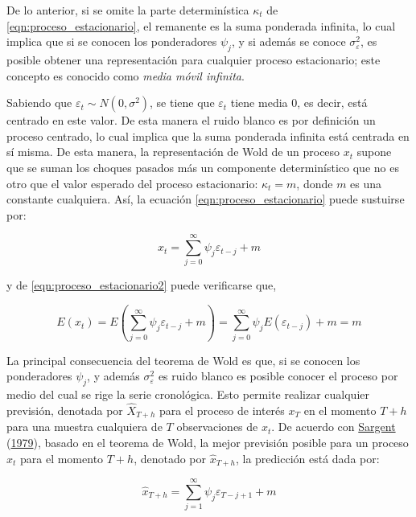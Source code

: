 \documentclass[
]{article}
\begin{document}
De lo anterior, si se omite la parte determinística \(\kappa_t\) de
\ref{eqn:proceso_estacionario}, el remanente es la suma ponderada
infinita, lo cual implica que si se conocen los ponderadores \(\psi_j\),
y si además se conoce \(\sigma_\varepsilon^2\), es posible obtener una
representación para cualquier proceso estacionario; este concepto es
conocido como \emph{media móvil infinita}.

Sabiendo que \(\varepsilon_t \sim N(0, \sigma^2)\), se tiene que
\(\varepsilon_t\) tiene media 0, es decir, está centrado en este valor.
De esta manera el ruido blanco es por definición un proceso centrado, lo
cual implica que la suma ponderada infinita está centrada en sí misma.
De esta manera, la representación de Wold de un proceso \(x_t\) supone
que se suman los choques pasados más un componente determinístico que no
es otro que el valor esperado del proceso estacionario: \(\kappa_t=m\),
donde \(m\) es una constante cualquiera. Así, la ecuación
\ref{eqn:proceso_estacionario} puede sustuirse por:

\begin{equation}
\label{eqn:proceso_estacionario2}
x_t=\sum_{j=0}^{\infty} \psi_j\varepsilon_{t-j}+m
\end{equation}

y de \ref{eqn:proceso_estacionario2} puede verificarse que,

\begin{equation}
\label{eqn:dem_proceso_estacionario2}
E(x_t)=E\left(\sum_{j=0}^{\infty} \psi_j\varepsilon_{t-j}+m\right)=\sum_{j=0}^{\infty} \psi_jE\left(\varepsilon_{t-j}\right) + m = m
\end{equation}

La principal consecuencia del teorema de Wold es que, si se conocen los
ponderadores \(\psi_j\), y además \(\sigma_\varepsilon^2\) es ruido
blanco es posible conocer el proceso por medio del cual se rige la serie
cronológica. Esto permite realizar cualquier previsión, denotada por
\(\hat X_{T+h}\) para el proceso de interés \(x_T\) en el momento
\(T+h\) para una muestra cualquiera de \(T\) observaciones de \(x_t\).
De acuerdo con \protect\hyperlink{ref-sargent_macro}{Sargent}
(\protect\hyperlink{ref-sargent_macro}{1979}), basado en el teorema de
Wold, la mejor previsión posible para un proceso \(x_t\) para el momento
\(T+h\), denotado por \(\hat x_{T+h}\), la predicción está dada por:

\begin{equation}
\label{eqn:prevision}
\hat x_{T+h}=\sum_{j=1}^{\infty} \psi_j \varepsilon_{T-j+1}+m
\end{equation}
\end{document}
